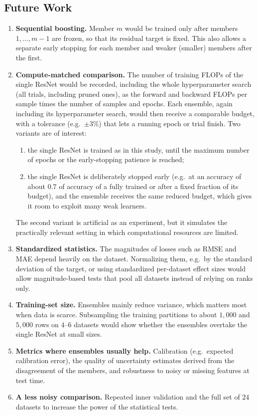 \documentclass[11pt, a4paper]{article}
\begin{document}
\subsection{Future Work}
\begin{enumerate}
    \item \textbf{Sequential boosting.} Member $m$ would be trained only after members $1, \dots, m-1$ are frozen, so that its residual target is fixed. This also allows a separate early stopping for each member and weaker (smaller) members after the first.
    \item \textbf{Compute-matched comparison.} The number of training FLOPs of the single ResNet would be recorded, including the whole hyperparameter search (all trials, including pruned ones), as the forward and backward FLOPs per sample times the number of samples and epochs. Each ensemble, again including its hyperparameter search, would then receive a comparable budget, with a tolerance (e.g.\ $\pm 3\%$) that lets a running epoch or trial finish. Two variants are of interest:
    \begin{enumerate}
        \item the single ResNet is trained as in this study, until the maximum number of epochs or the early-stopping patience is reached;
        \item the single ResNet is deliberately stopped early (e.g.\ at an accuracy of about $0.7$ of accuracy of a fully trained or after a fixed fraction of its budget), and the ensemble receives the same reduced budget, which gives it room to exploit many weak learners.
    \end{enumerate}
    The second variant is artificial as an experiment, but it simulates the practically relevant setting in which computational resources are limited.
    \item \textbf{Standardized statistics.} The magnitudes of losses such as RMSE and MAE depend heavily on the dataset. Normalizing them, e.g.\ by the standard deviation of the target, or using standardized per-dataset effect sizes would allow magnitude-based tests that pool all datasets instead of relying on ranks only.
    \item \textbf{Training-set size.} Ensembles mainly reduce variance, which matters most when data is scarce. Subsampling the training partitions to about $1{,}000$ and $5{,}000$ rows on $4$--$6$ datasets would show whether the ensembles overtake the single ResNet at small sizes.
    \item \textbf{Metrics where ensembles usually help.} Calibration (e.g.\ expected calibration error), the quality of uncertainty estimates derived from the disagreement of the members, and robustness to noisy or missing features at test time.
    \item \textbf{A less noisy comparison.} Repeated inner validation and the full set of $24$ datasets to increase the power of the statistical tests.
\end{enumerate}
\end{document}

